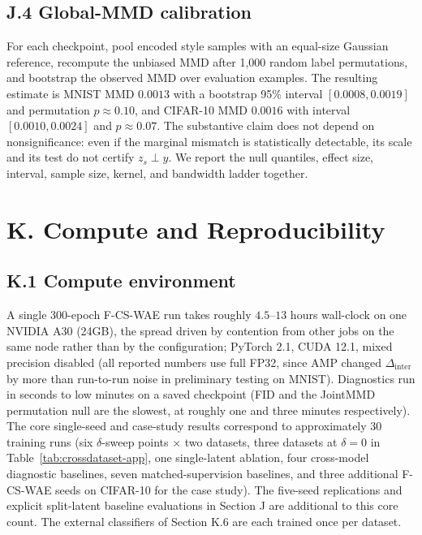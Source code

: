 \documentclass[letterpaper]{article} %
\newcommand{\ours}{F-CS-WAE}
\newcommand{\Dinter}{\Delta_{\mathrm{inter}}}
\begin{document}
\subsection{J.4 Global-MMD calibration}

For each checkpoint, pool encoded style samples with an equal-size
Gaussian reference, recompute the unbiased MMD after 1,000 random label
permutations, and bootstrap the observed MMD over evaluation examples. The
resulting estimate is MNIST MMD $0.0013$ with a bootstrap 95\% interval
$[0.0008,0.0019]$ and permutation $p\approx0.10$, and CIFAR-10 MMD $0.0016$
with interval $[0.0010,0.0024]$ and $p\approx0.07$. The substantive claim does
not depend on nonsignificance: even if
the marginal mismatch is statistically detectable, its scale and its test do
not certify $z_s\perp y$. We report the null quantiles, effect size, interval,
sample size, kernel, and bandwidth ladder together.

\section{K. Compute and Reproducibility}

\subsection{K.1 Compute environment}

A single 300-epoch \ours{} run takes roughly $4.5$--$13$ hours wall-clock on
one NVIDIA A30 (24GB), the spread driven by contention from other jobs on the
same node rather than by the configuration; PyTorch 2.1, CUDA 12.1, mixed
precision disabled (all reported numbers use full FP32, since AMP changed
$\Dinter$ by more than run-to-run noise in preliminary testing on MNIST).
Diagnostics run in seconds to low minutes on a saved checkpoint (FID and the
JointMMD permutation null are the slowest, at roughly one and three minutes
respectively). The core single-seed and case-study results correspond to
approximately $30$ training runs (six
$\delta$-sweep points $\times$ two datasets, three datasets at $\delta{=}0$
in Table~\ref{tab:crossdataset-app}, one single-latent ablation, four
cross-model diagnostic baselines, seven matched-supervision baselines, and
three additional \ours{} seeds on CIFAR-10 for the case study). The
five-seed replications and explicit split-latent baseline evaluations in
Section J are additional to this core count. The external classifiers of
Section K.6 are each trained once per dataset.
\end{document}
